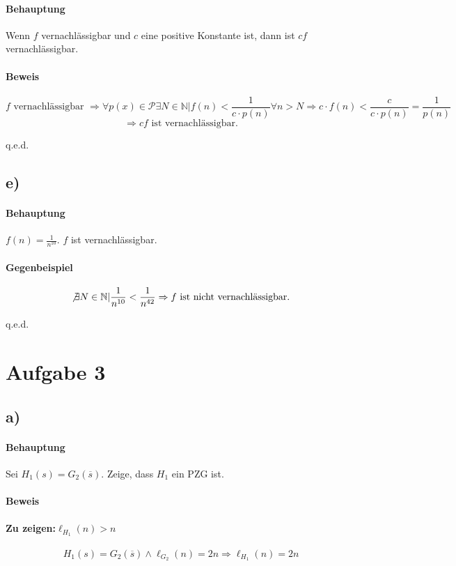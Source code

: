 \documentclass[a4paper,11pt,twoside]{scrartcl}
\begin{document}
\paragraph{Behauptung}
Wenn $f$ vernachlässigbar und $c$ eine positive Konstante ist, dann ist $cf$ vernachlässigbar.
\paragraph{Beweis}
\[ f \text{ vernachlässigbar }\Rightarrow \forall p(x)\in\mathcal{P} \exists N\in\mathbb{N} | f(n)<\frac{1}{c\cdot p(n)} \forall n>N\Rightarrow c\cdot f(n) < \frac{c}{c\cdot p(n)} = \frac{1}{p(n)}\]
\[ \Rightarrow cf \text{ ist vernachlässigbar.} \]
\begin{flushright}
	q.e.d.
\end{flushright}
\subsection*{e)}
\paragraph{Behauptung}
$f(n) = \frac{1}{n^{10}}$. $f$ ist vernachlässigbar.
\paragraph{Gegenbeispiel}
\[ \not\exists N\in\mathbb{N} | \frac{1}{n^{10}} < \frac{1}{n^{42}} \Rightarrow f\text{ ist nicht vernachlässigbar.} \]
\begin{flushright}
	q.e.d.
\end{flushright}
\section*{Aufgabe 3}
\subsection*{a)}

\paragraph{Behauptung}  Sei $H_1(s) = G_2(\overline{s})$.  Zeige, dass $H_1$ ein PZG ist.
\paragraph{Beweis}
\paragraph{Zu zeigen:$\ell_{H_1}(n) > n$}
\[ H_1(s) = G_2(\overline{s}) \land \ell_{G_2}(n) = 2n \Rightarrow \ell_{H_1}(n)=2n \]
\end{document}
